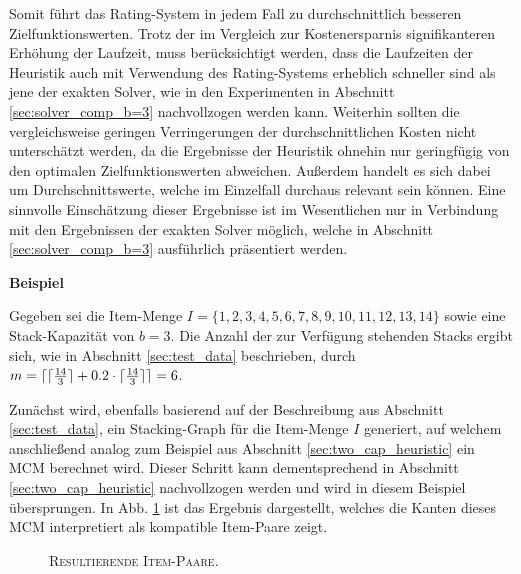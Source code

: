 Somit führt das Rating-System in jedem Fall zu durchschnittlich besseren Zielfunktionswerten.
Trotz der im Vergleich zur Kostenersparnis signifikanteren Erhöhung der Laufzeit, muss berücksichtigt werden,
dass die Laufzeiten der Heuristik auch mit Verwendung des Rating-Systems erheblich schneller sind als jene der
exakten Solver, wie in den Experimenten in Abschnitt \ref{sec:solver_comp_b=3} nachvollzogen werden kann.
Weiterhin sollten die vergleichsweise geringen Verringerungen der durchschnittlichen Kosten nicht unterschätzt werden,
da die Ergebnisse der Heuristik ohnehin nur geringfügig von den optimalen Zielfunktionswerten abweichen.
Außerdem handelt es sich dabei um Durchschnittswerte, welche im Einzelfall durchaus relevant sein können.
Eine sinnvolle Einschätzung dieser Ergebnisse ist im Wesentlichen nur in Verbindung mit den Ergebnissen der exakten Solver
möglich, welche in Abschnitt \ref{sec:solver_comp_b=3} ausführlich präsentiert werden.\newline

\textbf{Beispiel}

Gegeben sei die Item-Menge $I = \{1, 2, 3, 4, 5, 6, 7, 8, 9, 10, 11, 12, 13, 14\}$ sowie eine Stack-Kapazität von $b = 3$.
Die Anzahl der zur Verfügung stehenden Stacks ergibt sich, wie in Abschnitt \ref{sec:test_data} beschrieben,
durch $m = \lceil\lceil\frac{14}{3}\rceil + 0.2 \cdot  \lceil\frac{14}{3}\rceil\rceil = 6$.

Zunächst wird, ebenfalls basierend auf der Beschreibung aus Abschnitt \ref{sec:test_data}, ein Stacking-Graph
für die Item-Menge $I$ generiert, auf welchem anschließend analog zum Beispiel aus Abschnitt \ref{sec:two_cap_heuristic} ein
\textsc{MCM} berechnet wird. Dieser Schritt kann dementsprechend in Abschnitt \ref{sec:two_cap_heuristic} nachvollzogen werden
und wird in diesem Beispiel übersprungen. In Abb. \ref{fig:item_pairs_example_b=3} ist das Ergebnis dargestellt,
welches die Kanten dieses \textsc{MCM} interpretiert als kompatible Item-Paare zeigt.

\begin{figure}[H]
\centering
{}
\caption{\textsc{Resultierende Item-Paare}.}
\label{fig:item_pairs_example_b=3}
\end{figure}

